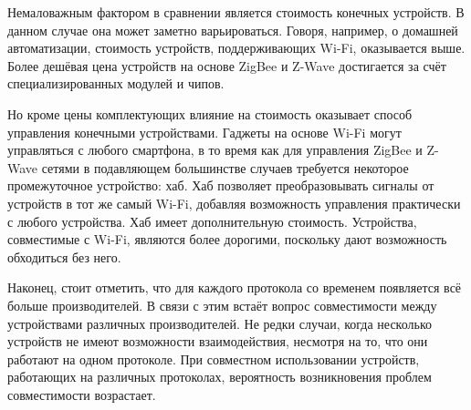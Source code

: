 	Немаловажным фактором в сравнении является стоимость конечных устройств. В данном случае она может
	заметно варьироваться. Говоря, например, о домашней автоматизации, стоимость устройств, поддерживающих
	Wi-Fi, оказывается выше. Более дешёвая цена устройств на основе ZigBee и Z-Wave достигается
	за счёт специализированных модулей и чипов.
	
	Но кроме цены комплектующих влияние на стоимость оказывает способ управления конечными устройствами.
	Гаджеты на основе Wi-Fi могут управляться с любого смартфона, в то время как для управления ZigBee и Z-Wave
	сетями в подавляющем большинстве случаев требуется некоторое промежуточное устройство: хаб. Хаб
	позволяет преобразовывать сигналы от устройств в тот же самый Wi-Fi, добавляя возможность управления
	практически с любого устройства. Хаб имеет дополнительную стоимость. Устройства, совместимые с  Wi-Fi,
	являются более дорогими, поскольку дают возможность обходиться без него.
	
	Наконец, стоит отметить, что для каждого протокола со временем появляется всё больше производителей.
	В связи с этим встаёт вопрос совместимости между устройствами различных производителей. Не редки случаи,
	когда несколько устройств не имеют возможности взаимодействия, несмотря на то, что они работают
	на одном протоколе. При совместном использовании устройств, работающих на различных протоколах,
	вероятность возникновения проблем совместимости возрастает.
	
